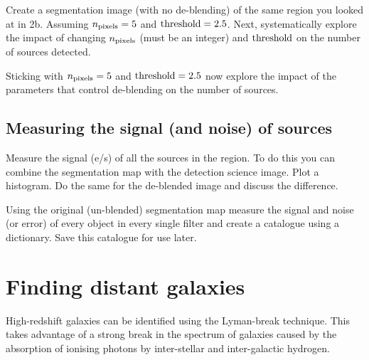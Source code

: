 \documentclass{article}
\begin{document}
\begin{question}
Create a segmentation image (with no de-blending) of the same region you looked at in 2b. Assuming $n_{\rm pixels} = 5$ and ${\rm threshold} = 2.5$. Next, systematically explore the impact of changing $n_{\rm pixels}$ (must be an integer) and ${\rm threshold}$ on the number of sources detected.
\end{question}


\begin{question}
Sticking with $n_{\rm pixels} = 5$ and ${\rm threshold} = 2.5$ now explore the impact of the parameters that control de-blending on the number of sources.
\end{question}


\subsection{Measuring the signal (and noise) of sources}


\begin{question}
Measure the signal (e/s) of all the sources in the region. To do this you can combine the segmentation map with the detection science image. Plot a histogram. Do the same for the de-blended image and discuss the difference.
\end{question}


\begin{question}
Using the original (un-blended) segmentation map measure the signal and noise (or error) of every object in every single filter and create a catalogue using a dictionary. Save this catalogue for use later.
\end{question}




\setcounter{Question}{0}
\section{Finding distant galaxies}

High-redshift galaxies can be identified using the Lyman-break technique. This takes advantage of a strong break in the spectrum of galaxies caused by the absorption of ionising photons by inter-stellar and inter-galactic hydrogen.
\end{document}
